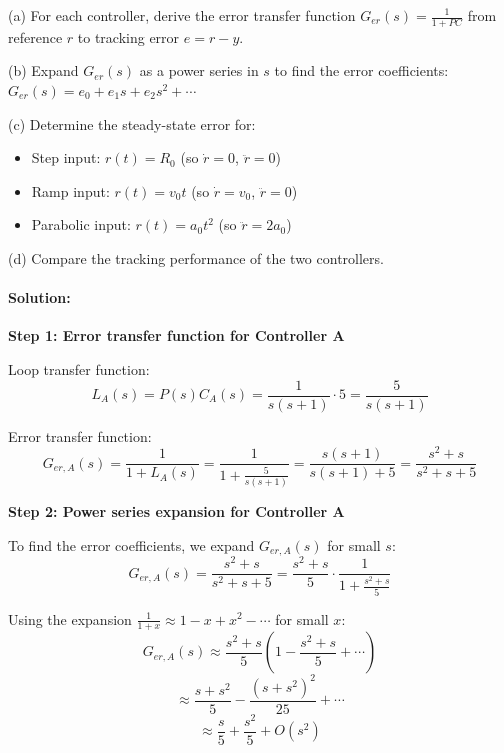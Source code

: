 \documentclass[11pt,a4paper]{article}
\begin{document}
(a) For each controller, derive the error transfer function $G_{er}(s) = \frac{1}{1+PC}$ from reference $r$ to tracking error $e = r - y$.

(b) Expand $G_{er}(s)$ as a power series in $s$ to find the error coefficients: $G_{er}(s) = e_0 + e_1 s + e_2 s^2 + \cdots$

(c) Determine the steady-state error for:
\begin{itemize}
\item Step input: $r(t) = R_0$ (so $\dot{r} = 0$, $\ddot{r} = 0$)
\item Ramp input: $r(t) = v_0 t$ (so $\dot{r} = v_0$, $\ddot{r} = 0$)
\item Parabolic input: $r(t) = a_0 t^2$ (so $\ddot{r} = 2a_0$)
\end{itemize}

(d) Compare the tracking performance of the two controllers.

\paragraph{Solution:}

\textbf{Step 1: Error transfer function for Controller A}

Loop transfer function:
\begin{equation}
	L_A(s) = P(s)C_A(s) = \frac{1}{s(s+1)} \cdot 5 = \frac{5}{s(s+1)}
\end{equation}

Error transfer function:
\begin{equation}
	G_{er,A}(s) = \frac{1}{1+L_A(s)} = \frac{1}{1 + \frac{5}{s(s+1)}} = \frac{s(s+1)}{s(s+1) + 5} = \frac{s^2 + s}{s^2 + s + 5}
\end{equation}

\textbf{Step 2: Power series expansion for Controller A}

To find the error coefficients, we expand $G_{er,A}(s)$ for small $s$:
\begin{equation}
	G_{er,A}(s) = \frac{s^2 + s}{s^2 + s + 5} = \frac{s^2 + s}{5} \cdot \frac{1}{1 + \frac{s^2 + s}{5}}
\end{equation}

Using the expansion $\frac{1}{1+x} \approx 1 - x + x^2 - \cdots$ for small $x$:
\begin{equation}
	G_{er,A}(s) \approx \frac{s^2 + s}{5}\left(1 - \frac{s^2 + s}{5} + \cdots\right)
\end{equation}
\begin{equation}
	\approx \frac{s + s^2}{5} - \frac{(s + s^2)^2}{25} + \cdots
\end{equation}
\begin{equation}
	\approx \frac{s}{5} + \frac{s^2}{5} + O(s^2)
\end{equation}
\end{document}
